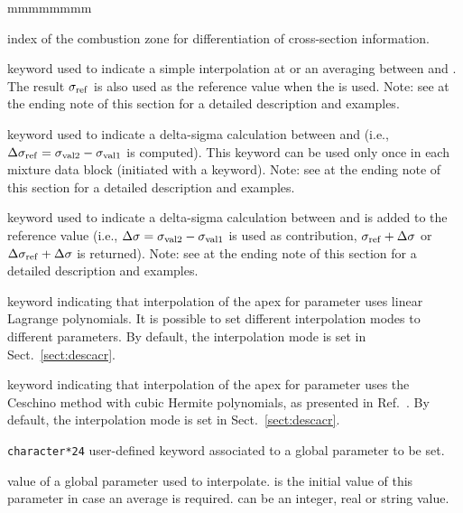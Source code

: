 \begin{ListeDeDescription}{mmmmmmmm}
\item[\dusa{ivarty}] index of the combustion zone for differentiation of cross-section information.

\item[\moc{SET}] keyword used to indicate a simple interpolation at  or an averaging between  and . The result $\sigma_{\rm ref}$ is also used as the reference value when the  is used. Note: see at the ending note of this section for a detailed description and examples.

\item[\moc{DELTA}] keyword used to indicate a delta-sigma calculation between  and 
(i.e., $\Delta\sigma_{\rm ref}=\sigma_{\rm val2}-\sigma_{\rm val1}$ is computed). This keyword can be used only once in each mixture data block (initiated
with a  keyword). Note: see at the ending note of this section for a detailed description and examples.

\item[\moc{ADD}] keyword used to indicate a delta-sigma calculation between  and  is added to the reference value
(i.e., $\Delta\sigma=\sigma_{\rm val2}-\sigma_{\rm val1}$ is used as contribution, $\sigma_{\rm ref}+\Delta\sigma$ or $\Delta\sigma_{\rm ref}+\Delta\sigma$ is returned). Note: see at the ending note of this section for a detailed description and examples.

\item[\moc{LINEAR}] keyword indicating that interpolation of the {\sc apex} for parameter  uses linear Lagrange
polynomials. It is possible to set different interpolation modes to different parameters. By default, the interpolation mode is set in Sect.~\ref{sect:descacr}.

\item[\moc{CUBIC}] keyword indicating that interpolation of the {\sc apex} for parameter  uses the Ceschino method
with cubic Hermite polynomials, as presented in Ref.~. By default, the interpolation mode is set in Sect.~\ref{sect:descacr}.

\item[\dusa{PARKEY}] {\tt character*24} user-defined keyword associated to a global
parameter to be set.

\item[\dusa{val1}] value of a global parameter used to interpolate.  is the initial value of this parameter in case an average is required.  can be an integer, real or string value.


\end{ListeDeDescription}
